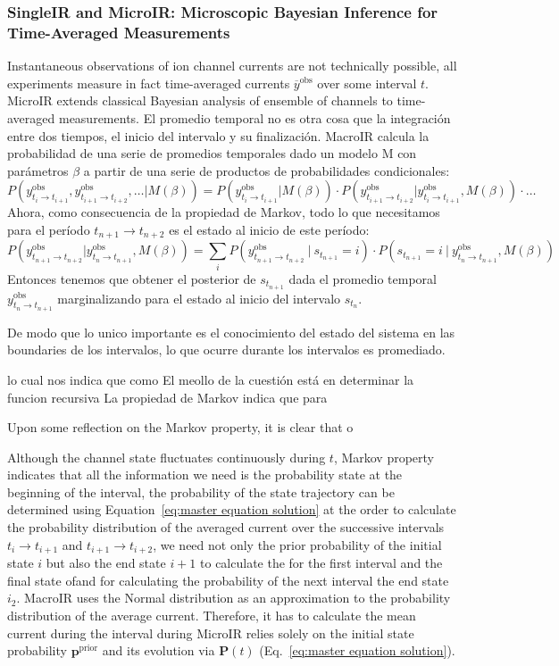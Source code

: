\documentclass[pdflatex,sn-nature]{sn-jnl}%
\begin{document}
\subsubsection{SingleIR and MicroIR: Microscopic Bayesian Inference for Time-Averaged Measurements}
Instantaneous observations of ion channel currents are not technically possible, all experiments measure in fact time-averaged currents \(\overline{y}^{\text{obs}}\) over some interval \(t\). MicroIR extends classical Bayesian analysis of ensemble of channels to time-averaged measurements. El promedio temporal no es otra cosa que la integración entre dos tiempos, el inicio del intervalo y su finalización. MacroIR calcula la probabilidad de una serie de promedios temporales dado un modelo M con parámetros $\beta$ a partir de una serie de productos de probabilidades condicionales:
$$
P(y^{\text{obs}}_{t_{i}\rightarrow t_{i+1}},y^{\text{obs}}_{t_{i+1}\rightarrow t_{i+2}},\dots | M(\beta))=
P(y^{\text{obs}}_{t_{i}\rightarrow t_{i+1}} | M(\beta)) \cdot P(y^{\text{obs}}_{t_{i+1}\rightarrow t_{i+2}}|y^{\text{obs}}_{t_{i}\rightarrow t_{i+1}}, M(\beta))\cdot \dots
$$
Ahora, como consecuencia de la propiedad de Markov, todo lo que necesitamos para el período $t_{n+1}\rightarrow t_{n+2}$ es el estado al inicio de este período: 
$$
P(y^{\text{obs}}_{t_{n+1}\rightarrow t_{n+2}}|y^{\text{obs}}_{t_{n}\rightarrow t_{n+1}}, M(\beta))= \sum_{i} P(y^{\text{obs}} _{t_{n+1}\rightarrow t_{n+2}}~|~s_{t_{n+1}}=i) \cdot P(s_{t_{n+1}}=i~|~y^{\text{obs}}_{t_{n}\rightarrow t_{n+1}}, M(\beta))
$$
Entonces tenemos que obtener el posterior de $s_{t_{n+1}}$ dada el promedio temporal $y^{\text{obs}}_{t_{n}\rightarrow t_{n+1}}$ marginalizando para el estado al inicio del intervalo $s_{t_n}$. 

De modo que lo unico importante es el conocimiento del estado del sistema en las boundaries de los intervalos, lo que ocurre durante los intervalos es promediado. 

lo cual nos indica que como 
El meollo de la cuestión está en determinar la funcion recursiva 
La propiedad de Markov indica que para 

Upon some reflection on the Markov property, it is clear that o 


Although the channel state fluctuates continuously during \(t\), Markov property indicates that all the information we need is the probability state at the beginning of the interval, the probability of the state trajectory can be determined using Equation~\ref{eq:master equation solution}
at the  order to calculate the probability distribution of the averaged current over the successive intervals $t_{i}\rightarrow t_{i+1}$ and $t_{i+1}\rightarrow t_{i+2}$, we need not only the prior probability of the initial state $i$ but also the end state $i+1$ to calculate the for the first interval and the final state ofand for calculating the probability of the next interval  the end state $i_2$. 
MacroIR uses the Normal distribution as an approximation to the probability distribution of the average current. Therefore, it has to calculate the mean current during the interval  during 
MicroIR relies solely on the initial state probability \(\boldsymbol{p}^{\text{prior}}\) and its evolution via \(\mathbf{P}(t)\) (Eq.~\ref{eq:master equation solution}).
\end{document}
